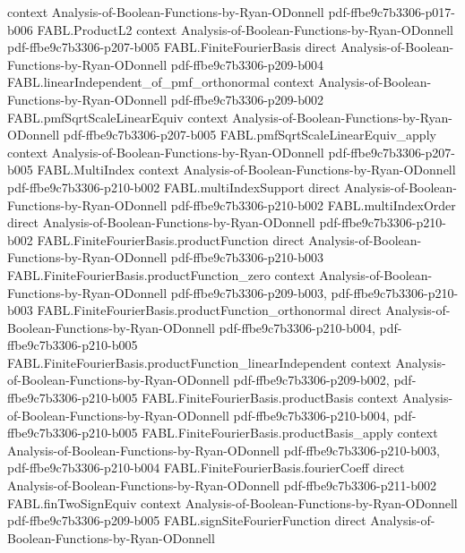 \begin{theorem}
  {context}
  {Analysis-of-Boolean-Functions-by-Ryan-ODonnell}
  {pdf-ffbe9c7b3306-p017-b006}
\proofstep
  {FABL.ProductL2}
  {context}
  {Analysis-of-Boolean-Functions-by-Ryan-ODonnell}
  {pdf-ffbe9c7b3306-p207-b005}
\proofstep
  {FABL.FiniteFourierBasis}
  {direct}
  {Analysis-of-Boolean-Functions-by-Ryan-ODonnell}
  {pdf-ffbe9c7b3306-p209-b004}
\proofstep
  {FABL.linearIndependent_of_pmf_orthonormal}
  {context}
  {Analysis-of-Boolean-Functions-by-Ryan-ODonnell}
  {pdf-ffbe9c7b3306-p209-b002}
\proofstep
  {FABL.pmfSqrtScaleLinearEquiv}
  {context}
  {Analysis-of-Boolean-Functions-by-Ryan-ODonnell}
  {pdf-ffbe9c7b3306-p207-b005}
\proofstep
  {FABL.pmfSqrtScaleLinearEquiv_apply}
  {context}
  {Analysis-of-Boolean-Functions-by-Ryan-ODonnell}
  {pdf-ffbe9c7b3306-p207-b005}
\proofstep
  {FABL.MultiIndex}
  {context}
  {Analysis-of-Boolean-Functions-by-Ryan-ODonnell}
  {pdf-ffbe9c7b3306-p210-b002}
\proofstep
  {FABL.multiIndexSupport}
  {direct}
  {Analysis-of-Boolean-Functions-by-Ryan-ODonnell}
  {pdf-ffbe9c7b3306-p210-b002}
\proofstep
  {FABL.multiIndexOrder}
  {direct}
  {Analysis-of-Boolean-Functions-by-Ryan-ODonnell}
  {pdf-ffbe9c7b3306-p210-b002}
\proofstep
  {FABL.FiniteFourierBasis.productFunction}
  {direct}
  {Analysis-of-Boolean-Functions-by-Ryan-ODonnell}
  {pdf-ffbe9c7b3306-p210-b003}
\proofstep
  {FABL.FiniteFourierBasis.productFunction_zero}
  {context}
  {Analysis-of-Boolean-Functions-by-Ryan-ODonnell}
  {pdf-ffbe9c7b3306-p209-b003,
    pdf-ffbe9c7b3306-p210-b003}
\proofstep
  {FABL.FiniteFourierBasis.productFunction_orthonormal}
  {direct}
  {Analysis-of-Boolean-Functions-by-Ryan-ODonnell}
  {pdf-ffbe9c7b3306-p210-b004,
    pdf-ffbe9c7b3306-p210-b005}
\proofstep
  {FABL.FiniteFourierBasis.productFunction_linearIndependent}
  {context}
  {Analysis-of-Boolean-Functions-by-Ryan-ODonnell}
  {pdf-ffbe9c7b3306-p209-b002,
    pdf-ffbe9c7b3306-p210-b005}
\proofstep
  {FABL.FiniteFourierBasis.productBasis}
  {context}
  {Analysis-of-Boolean-Functions-by-Ryan-ODonnell}
  {pdf-ffbe9c7b3306-p210-b004,
    pdf-ffbe9c7b3306-p210-b005}
\proofstep
  {FABL.FiniteFourierBasis.productBasis_apply}
  {context}
  {Analysis-of-Boolean-Functions-by-Ryan-ODonnell}
  {pdf-ffbe9c7b3306-p210-b003,
    pdf-ffbe9c7b3306-p210-b004}
\proofstep
  {FABL.FiniteFourierBasis.fourierCoeff}
  {direct}
  {Analysis-of-Boolean-Functions-by-Ryan-ODonnell}
  {pdf-ffbe9c7b3306-p211-b002}
\proofstep
  {FABL.finTwoSignEquiv}
  {context}
  {Analysis-of-Boolean-Functions-by-Ryan-ODonnell}
  {pdf-ffbe9c7b3306-p209-b005}
\proofstep
  {FABL.signSiteFourierFunction}
  {direct}
  {Analysis-of-Boolean-Functions-by-Ryan-ODonnell}

\end{theorem}

